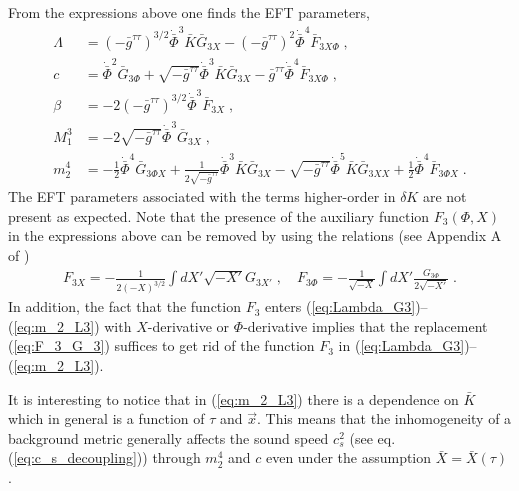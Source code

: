 \documentclass[a4paper,11pt]{article}
\numberwithin{equation}{section}
\begin{document}
From the expressions above one finds the EFT parameters,
\begin{align}
\Lambda &= (-\bar{g}^{\tau\tau})^{3/2}\dot{\bar{\Phi}}^3 \bar{K} \bar{G}_{3X} - (-\bar{g}^{\tau\tau})^2 \dot{\bar{\Phi}}^4 \bar{F}_{3X\Phi} \;, \label{eq:Lambda_G3} \\
c &= \dot{\bar{\Phi}}^2 \bar{G}_{3\Phi} + \sqrt{-\bar{g}^{\tau\tau}} \dot{\bar{\Phi}}^3 \bar{K} \bar{G}_{3X} - \bar{g}^{\tau\tau} \dot{\bar{\Phi}}^4 \bar{F}_{3X\Phi}  \;, \\
\beta &= -2 (-\bar{g}^{\tau\tau})^{3/2} \dot{\bar{\Phi}}^3 \bar{F}_{3X}  \;, \\
M_1^3 &= -2 \sqrt{-\bar{g}^{\tau\tau}} \dot{\bar{\Phi}}^3 \bar{G}_{3X}  \;, \\
m_2^4 &= -\frac{1}{2} \dot{\bar{\Phi}}^4 \bar{G}_{3 \Phi X} + \frac{1}{2\sqrt{-\bar{g}^{\tau\tau}}}  \dot{\bar{\Phi}}^3 \bar{K} \bar{G}_{3 X} - \sqrt{-\bar{g}^{\tau\tau}} \dot{\bar{\Phi}}^5 \bar{K} \bar{G}_{3XX} + \frac{1}{2} \dot{\bar{\Phi}}^4 \bar{F}_{3\Phi X} \;. \label{eq:m_2_L3}
\end{align}
The EFT parameters associated with the terms higher-order in $\delta K$ are not present as expected. Note that the presence of the auxiliary function $F_3(\Phi,X)$ in the expressions above can be removed by using the relations (see Appendix A of \cite{Cusin:2017mzw})
\begin{align}\label{eq:F_3_G_3}
F_{3X} =  - \frac{1}{2 (-X)^{3/2}} \int dX' \sqrt{-X'} G_{3X'} \;, \quad F_{3\Phi} = -\frac{1}{\sqrt{-X}} \int dX' \frac{G_{3\Phi}}{2 \sqrt{-X'}} \;.
\end{align}
In addition, the fact that the function $F_3$ enters (\ref{eq:Lambda_G3})--(\ref{eq:m_2_L3}) with $X$-derivative or $\Phi$-derivative implies that the replacement (\ref{eq:F_3_G_3}) suffices to get rid of the function $F_3$ in (\ref{eq:Lambda_G3})--(\ref{eq:m_2_L3}).

It is interesting to notice that in (\ref{eq:m_2_L3}) there is a dependence on $\bar{K}$ which in general is a function of $\tau$ and $\vec{x}$. This means that the inhomogeneity of a background metric generally affects the sound speed $c_s^2$ (see eq.(\ref{eq:c_s_decoupling})) through $m_2^4$ and $c$ even under the assumption $\bar{X}=\bar{X}(\tau)$. 
\end{document}
